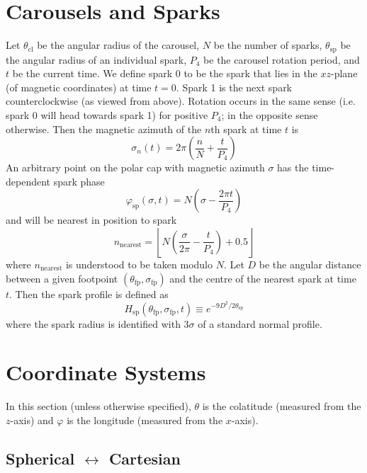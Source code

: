 \documentclass{article}
\newcommand{\phase}{\varphi}
\begin{document}
\section{Carousels and Sparks}
\label{sec:carousel}

Let $\theta_\text{cl}$ be the angular radius of the carousel, $N$ be the number of sparks, $\theta_\text{sp}$ be the angular radius of an individual spark, $P_4$ be the carousel rotation period, and $t$ be the current time.
We define spark $0$ to be the spark that lies in the $xz$-plane (of magnetic coordinates) at time $t=0$.
Spark 1 is the next spark counterclockwise (as viewed from above).
Rotation occurs in the same sense (i.e. spark 0 will head towards spark 1) for positive $P_4$; in the opposite sense otherwise.
Then the magnetic azimuth of the $n$th spark at time $t$ is
\begin{equation}
    \sigma_n(t) = 2\pi\left(\frac{n}{N} + \frac{t}{P_4}\right)
\end{equation}
An arbitrary point on the polar cap with magnetic azimuth $\sigma$ has the time-dependent spark phase
\begin{equation}
    \phase_\text{sp}(\sigma,t) = N\left(\sigma - \frac{2\pi t}{P_4}\right)
\end{equation}
and will be nearest in position to spark
\begin{equation}
    n_\text{nearest} = \left\lfloor N\left(\frac{\sigma}{2\pi} - \frac{t}{P_4}\right) + 0.5 \right\rfloor
\end{equation}
where $n_\text{nearest}$ is understood to be taken modulo $N$.
Let $D$ be the angular distance between a given footpoint $(\theta_\text{fp},\sigma_\text{fp})$ and the centre of the nearest spark at time $t$.
Then the spark profile is defined as
\begin{equation}
    H_\text{sp}(\theta_\text{fp},\sigma_\text{fp},t) \equiv e^{-9D^2/2\theta_\text{sp}}
\end{equation}
where the spark radius is identified with $3\sigma$ of a standard normal profile.

\section{Coordinate Systems}

In this section (unless otherwise specified), $\theta$ is the colatitude (measured from the $z$-axis) and $\phase$ is the longitude (measured from the $x$-axis).

\subsection{Spherical $\leftrightarrow$ Cartesian}
\end{document}
